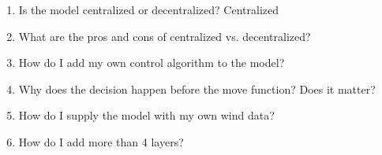 \begin{enumerate}
    \item Is the model centralized or decentralized? Centralized
    \item What are the pros and cons of centralized vs. decentralized?
    \item How do I add my own control algorithm to the model?
    \item Why does the decision happen before the move function? Does it matter?
    \item How do I supply the model with my own wind data?
    \item How do I add more than 4 layers?
\end{enumerate}
